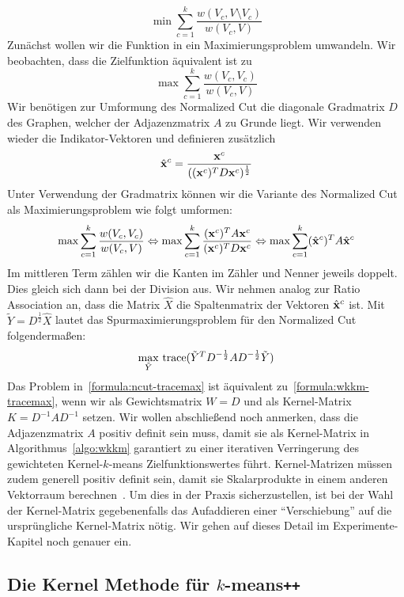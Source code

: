 \[ \min \sum_{c=1}^{k} \frac{w(V_c, V \setminus V_c)}{w(V_c, V)} \]
Zunächst wollen wir die Funktion in ein Maximierungsproblem umwandeln. Wir beobachten, dass die Zielfunktion äquivalent ist
zu
\[ \max \sum_{c=1}^{k} \frac{w(V_c, V_c)}{w(V_c, V)} \]
Wir benötigen zur Umformung des Normalized Cut die diagonale Gradmatrix $D$ des Graphen, welcher der Adjazenzmatrix $A$ zu
Grunde liegt. Wir verwenden wieder die Indikator-Vektoren und definieren zusätzlich
\[ \hat{\mathbf{x}}^c = \frac{\mathbf{x}^c}{ ((\mathbf{x}^c)^T D \mathbf{x}^c)^{\frac{1}{2}} } \]
Unter Verwendung der Gradmatrix können wir die Variante des Normalized Cut als Maximierungsproblem wie folgt umformen:
\[ \max \sum_{c=1}^{k} \frac{w(V_c, V_c)}{w(V_c, V)}
	\Leftrightarrow \max \sum_{c=1}^{k} \frac{(\mathbf{x}^c)^T A \mathbf{x}^c}{(\mathbf{x}^c)^T D \mathbf{x}^c} 
	\Leftrightarrow \max \sum_{c=1}^{k} (\hat{\mathbf{x}}^c)^T A \hat{\mathbf{x}}^c \]
Im mittleren Term zählen wir die Kanten im Zähler und Nenner jeweils doppelt. Dies gleich sich dann bei der Division aus.
Wir nehmen analog zur Ratio Association an, dass die Matrix $\hat{X}$ die Spaltenmatrix der Vektoren $\hat{\mathbf{x}}^c$ ist.
Mit $\tilde{Y} = D^\frac{1}{2} \hat{X}$ lautet das Spurmaximierungsproblem für den Normalized Cut folgendermaßen:
\begin{align}
\label{formula:ncut-tracemax}
	\max_{\tilde{Y}}{} \operatorname*{trace}( \tilde{Y}^T D^{-\frac{1}{2}} A D^{-\frac{1}{2}} \tilde{Y} )
\end{align}
Das Problem in~\ref{formula:ncut-tracemax} ist äquivalent zu~\ref{formula:wkkm-tracemax}, wenn wir als
Gewichtsmatrix $W = D$ und als Kernel-Matrix $K = D^{-1} A D^{-1}$ setzen.
\absatz
Wir wollen abschließend noch anmerken, dass die Adjazenzmatrix $A$ positiv definit sein muss, damit sie als Kernel-Matrix in
Algorithmus~\ref{algo:wkkm} garantiert zu einer iterativen Verringerung des gewichteten Kernel-$k$-means Zielfunktionswertes
führt. Kernel-Matrizen müssen zudem generell positiv definit sein, damit sie Skalarprodukte in einem anderen Vektorraum
berechnen~\cite{Shawe-TaylorC04}.
Um dies in der Praxis sicherzustellen, ist bei der Wahl der Kernel-Matrix gegebenenfalls das Aufaddieren einer
"`Verschiebung"' auf die ursprüngliche Kernel-Matrix nötig. Wir gehen auf dieses Detail im Experimente-Kapitel noch genauer ein.

\subsection{Die Kernel Methode für \texorpdfstring{$k$}{k}-means\texttt{++}}
\label{subsection:kernelkmpp}

